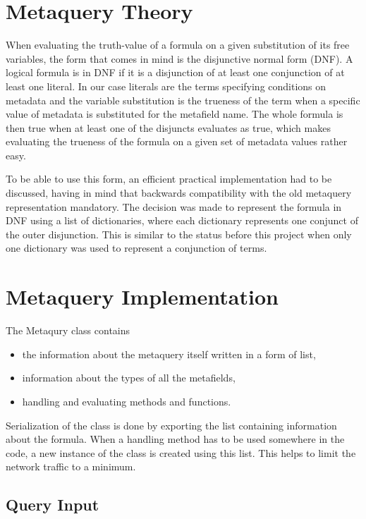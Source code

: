 \section{Metaquery Theory}

When evaluating the truth-value of a formula on a given substitution of its free variables, the 
form that comes in mind is the disjunctive normal form (DNF). A logical formula is in DNF if
it is a disjunction of at least one conjunction of at least one literal. In our case literals 
are the terms specifying conditions on metadata and the variable substitution is the trueness
of the term when a specific value of metadata is substituted for the metafield name. The whole
formula is then true when at least one of the disjuncts evaluates as true, which makes evaluating
the trueness of the formula on a given set of metadata values rather easy.

To be able to use this form, an efficient practical implementation had to be discussed, having in 
mind that backwards compatibility with the old metaquery representation mandatory. The decision 
was made to represent the formula in DNF using a list of dictionaries, where each dictionary 
represents one conjunct of the outer disjunction. This is similar to the status before this project
when only one dictionary was used to represent a conjunction of terms. 

\section{Metaquery Implementation}

The Metaqury class contains 
\begin{itemize}
\item the information about the metaquery itself written in a form of list,
\item information about the types of all the metafields,
\item handling and evaluating methods and functions.
\end{itemize}
Serialization of the class is done by exporting the list containing information about the formula. 
When a handling method has to be used somewhere in the code, a new instance of the class is created 
using this list. This helps to limit the network traffic to a minimum. 

\subsection{Query Input}

